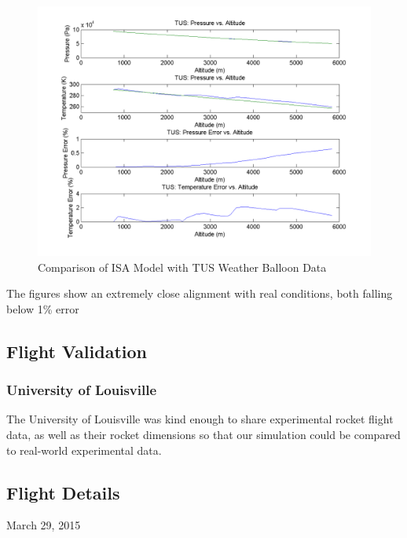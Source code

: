 \documentclass[]{article}
\begin{document}
\begin{figure}[htbp]
\centering
\includegraphics{images/plots/TUS_plot.png}
\caption{Comparison of ISA Model with TUS Weather Balloon Data
\label{atmosphere2_plot_label}}
\end{figure}

The figures show an extremely close alignment with real conditions, both
falling below 1\% error

\subsection{Flight Validation}\label{flight-validation}

\subsubsection{University of Louisville}\label{university-of-louisville}

The University of Louisville was kind enough to share experimental
rocket flight data, as well as their rocket dimensions so that our
simulation could be compared to real-world experimental data.

\subsection{Flight Details}\label{flight-details}

March 29, 2015
\end{document}

